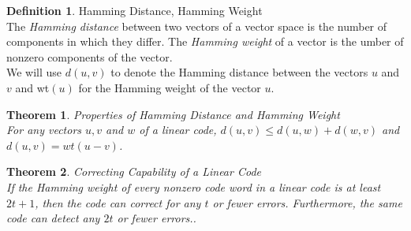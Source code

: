 \documentclass{article}
\newtheorem{theorem}{Theorem}
\theoremstyle{definition}
\newtheorem{definition}{Definition}
\begin{document}
\begin{definition}{Hamming Distance, Hamming Weight}\\The \textit{Hamming distance} between two vectors of a vector space is the number of components in which they differ. The \textit{Hamming weight} of a vector is the umber of nonzero components of the vector.\\ We will use $d(u,v)$ to denote the Hamming distance between the vectors $u$ and $v$ and wt$(u)$ for the Hamming weight of the vector $u$.
\end{definition}

\begin{theorem}{Properties of Hamming Distance and Hamming Weight}\\
For any vectors $u,v$ and $w$ of a linear code, $d(u,v)\leq d(u,w)+d(w,v)$ and $d(u,v)=wt(u-v)$.
\end{theorem}

\begin{theorem}{Correcting Capability of a Linear Code}\\
If the Hamming weight of every nonzero code word in a linear code is at least $2t+1$, then the code can correct for any $t$ or fewer errors. Furthermore, the same code can detect any $2t$ or fewer errors..
\end{theorem}
\end{document}

